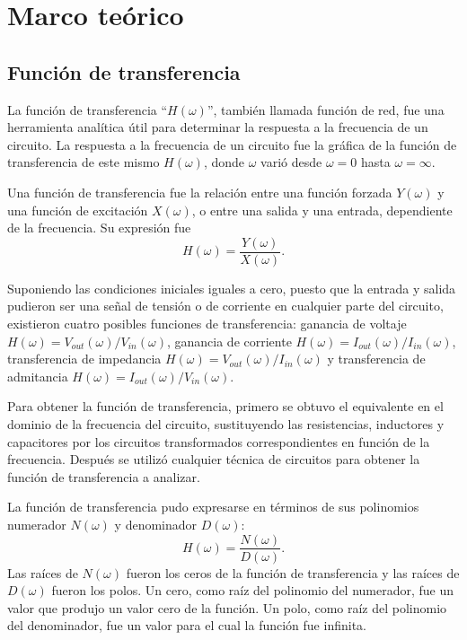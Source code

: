 \documentclass[12pt,a4paper]{article}
\begin{document}
\section{Marco teórico}
\subsection{Función de transferencia}
La función de transferencia ``\(H(\omega)\)'', también llamada función de red, fue una herramienta analítica útil para determinar la respuesta a la frecuencia de un circuito. La respuesta a la frecuencia de un circuito fue la gráfica de la función de transferencia de este mismo \(H(\omega)\), donde \(\omega\) varió desde \(\omega=0\) hasta \(\omega=\infty\).

Una función de transferencia fue la relación entre una función forzada \(Y(\omega)\) y una función de excitación \(X(\omega)\), o entre una salida y una entrada, dependiente de la frecuencia. Su expresión fue
\begin{equation}
    H(\omega)=\frac{Y(\omega)}{X(\omega)}.
    \label{eq:transferencia}
\end{equation}

Suponiendo las condiciones iniciales iguales a cero, puesto que la entrada y salida pudieron ser una señal de tensión o de corriente en cualquier parte del circuito, existieron cuatro posibles funciones de transferencia: ganancia de voltaje \(H(\omega)=V_{out}(\omega)/V_{in}(\omega)\), ganancia de corriente \(H(\omega)=I_{out}(\omega)/I_{in}(\omega)\), transferencia de impedancia \(H(\omega)=V_{out}(\omega)/I_{in}(\omega)\) y transferencia de admitancia \(H(\omega)=I_{out}(\omega)/V_{in}(\omega)\).

Para obtener la función de transferencia, primero se obtuvo el equivalente en el dominio de la frecuencia del circuito, sustituyendo las resistencias, inductores y capacitores por los circuitos transformados correspondientes en función de la frecuencia. Después se utilizó cualquier técnica de circuitos para obtener la función de transferencia a analizar.

La función de transferencia pudo expresarse en términos de sus polinomios numerador \(N(\omega)\) y denominador \(D(\omega)\):
\begin{equation}
    H(\omega)=\frac{N(\omega)}{D(\omega)}.
    \label{eq:numeradordenominador}
\end{equation}
Las raíces de \(N(\omega)\) fueron los ceros de la función de transferencia y las raíces de \(D(\omega)\) fueron los polos. Un cero, como raíz del polinomio del numerador, fue un valor que produjo un valor cero de la función. Un polo, como raíz del polinomio del denominador, fue un valor para el cual la función fue infinita.
\end{document}
